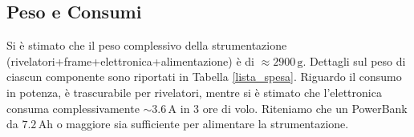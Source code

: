 \subsection{Peso e Consumi}
Si è stimato che il peso complessivo della strumentazione (rivelatori+frame+elettronica+alimentazione) è di $\approx 2900\,\text{g}$. Dettagli sul peso di ciascun componente sono riportati in Tabella \ref{lista_spesa}. Riguardo il consumo in potenza, è trascurabile per rivelatori, mentre si è stimato che l'elettronica consuma complessivamente $\sim 3.6\,\text{A}$ in 3 ore di volo. Riteniamo che un PowerBank da $7.2\,\text{Ah}$ o maggiore sia sufficiente per alimentare la strumentazione.